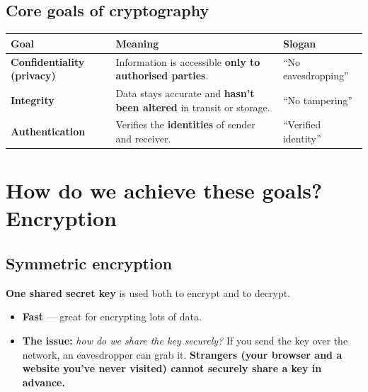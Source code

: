 \subsection{Core goals of cryptography}
\begin{center}
\begin{tabularx}{\textwidth}{>{\bfseries}l X l}
\toprule
Goal & Meaning & Slogan \\
\midrule
Confidentiality (privacy) & Information is accessible \textbf{only to authorised parties}. & ``No eavesdropping'' \\
Integrity & Data stays accurate and \textbf{hasn't been altered} in transit or storage. & ``No tampering'' \\
Authentication & Verifies the \textbf{identities} of sender and receiver. & ``Verified identity'' \\
\bottomrule
\end{tabularx}
\end{center}

\section{How do we achieve these goals? Encryption}

\subsection{Symmetric encryption}
\textbf{One shared secret key} is used both to encrypt and to decrypt.
\begin{center}
\end{center}
\begin{itemize}
  \item \textbf{Fast} --- great for encrypting lots of data.
  \item \textbf{The issue:} \emph{how do we share the key securely?} If you send the key over the network, an eavesdropper can grab it. \textbf{Strangers (your browser and a website you've never visited) cannot securely share a key in advance.}
\end{itemize}

